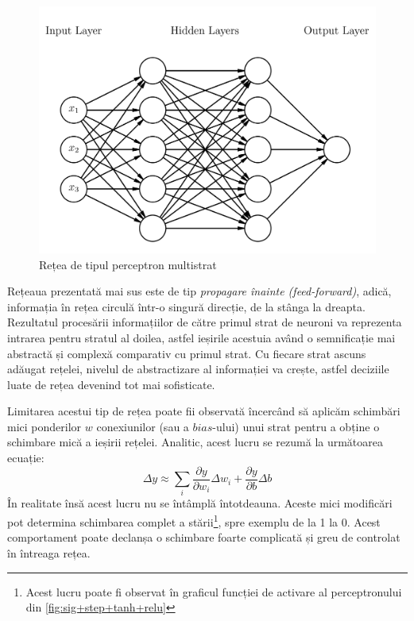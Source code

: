 \begin{figure}[ht]
\center
\includegraphics[width=\textwidth, keepaspectratio]{fig/cap2/mlp.png}
\caption{Rețea de tipul perceptron multistrat}
\label{fig:mlp}
\end{figure}

Rețeaua prezentată mai sus este de tip \textit{propagare înainte (feed-forward)}, adică, informația în rețea circulă într-o singură direcție, de la stânga la dreapta. Rezultatul procesării informațiilor de către primul strat de neuroni va reprezenta intrarea pentru stratul al doilea, astfel ieșirile acestuia având o semnificație mai abstractă și complexă comparativ cu primul strat. Cu fiecare strat ascuns adăugat rețelei, nivelul de abstractizare al informației va crește, astfel deciziile luate de rețea devenind tot mai sofisticate.

Limitarea acestui tip de rețea poate fii observată încercând să aplicăm schimbări mici ponderilor $w$ conexiunilor (sau a $bias$-ului) unui strat pentru a obține o schimbare mică a ieșirii rețelei. Analitic, acest lucru se rezumă la următoarea ecuație:
\begin{equation}
\Delta y\approx\sum_i\frac{\partial y}{\partial w_i}\Delta w_i + \frac{\partial y}{\partial b}\Delta b
\end{equation}
În realitate însă acest lucru nu se întâmplă întotdeauna. Aceste mici modificări pot determina schimbarea complet a stării\footnote{Acest lucru poate fi observat în graficul funcției de activare al perceptronului din \autoref{fig:sig+step+tanh+relu}}, spre exemplu de la 1 la 0. Acest comportament poate declanșa o schimbare foarte complicată și greu de controlat în întreaga rețea.

